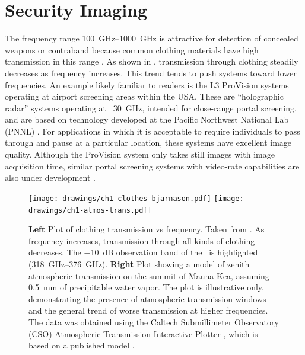 \section{Security Imaging}

The frequency range \SIrange{100}{1000}{\GHz} is attractive for detection of concealed weapons or contraband because common clothing materials have high transmission in this range \cite{bjarnason_millimeter-wave_2004}.
As shown in , transmission through clothing steadily decreases as frequency increases.
This trend tends to push systems toward lower frequencies.
An example likely familiar to readers is the L3 ProVision systems operating at airport screening areas within the USA.
These are ``holographic radar'' systems operating at ~\SI{30}{\GHz}, intended for close-range portal screening, and are based on technology developed at the Pacific Northwest National Lab (PNNL) \cite{sheen_cylindrical_1998,mcmakin_dual-surface_2009}.
For applications in which it is acceptable to require individuals to pass through and pause at a particular location, these systems have excellent image quality.
Although the ProVision system only takes still images with  image acquisition time, similar portal screening systems with video-rate capabilities are also under development \cite{lyons_reflect-array_2013}.

\begin{figure}
\centering
\texttt{[image: drawings/ch1-clothes-bjarnason.pdf]}
\texttt{[image: drawings/ch1-atmos-trans.pdf]}
\caption[Clothing and Atmospheric Transmission vs Frequency]{
  \textbf{Left}
  Plot of clothing transmission vs frequency.
  Taken from \cite{bjarnason_millimeter-wave_2004}.
  As frequency increases, transmission through all kinds of clothing decreases.
  The \SI{-10}{\dB} observation band of the \Imager\ is highlighted (\SIrange{318}{376}{\GHz}).
  \textbf{Right}
  Plot showing a model of zenith atmospheric transmission on the summit of Mauna Kea, assuming \SI{0.5}{\mm} of precipitable water vapor.
  The plot is illustrative only, demonstrating the presence of atmospheric transmission windows and the general trend of worse transmission at higher frequencies.
  The data was obtained using the Caltech Submillimeter Observatory (CSO) Atmospheric Transmission Interactive Plotter \cite{darek_lis_cso_????}, which is based on a published model \cite{pardo_atmospheric_2001}.
}
\label{fig:ch1-clothes-atmos-trans}
\end{figure}

